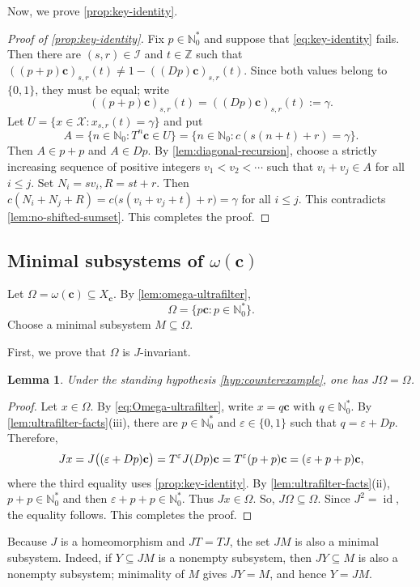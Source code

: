 \documentclass[reqno,12pt]{amsart}
\newtheorem{lemma}[thm]{Lemma}
\newcommand{\Nzero}{\mathbb N_0}
\newcommand{\Nstar}{\Nzero^{*}}
\newcommand{\two}{\{0,1\}}
\def \Z {\mathbb Z}
\numberwithin{equation}{section}
\begin{document}
Now, we prove \cref{prop:key-identity}.
\begin{proof}[Proof of \cref{prop:key-identity}]
		Fix $p\in\Nstar$ and suppose that \eqref{eq:key-identity} fails.  Then
		there are $(s,r)\in\mathcal I$ and $t\in\Z$ such that
		$
		((p+p)\mathbf c)_{s,r}(t)
		\neq 1-((Dp)\mathbf c)_{s,r}(t).
		$
Since both values belong to $\two$, they must be equal; write
				$$
		((p+p)\mathbf c)_{s,r}(t)
		=((Dp)\mathbf c)_{s,r}(t)
		:=\gamma.
		$$
		Let
		$
		U=\{x\in\mathcal X:x_{s,r}(t)=\gamma\}
		$
		and put
		\[
		A=\{n\in\Nzero:T^n\mathbf c\in U\}
		=\{n\in\Nzero:c(s(n+t)+r)=\gamma\}.
		\]
		Then $A\in p+p$ and $A\in Dp$.
		By \cref{lem:diagonal-recursion}, choose a strictly increasing sequence of
		positive integers $v_1<v_2<\cdots$ such that $v_i+v_j\in A$ for all $i\leq j$.  Set
		$
		N_i=sv_i,
		R=st+r.
		$
		Then
		$
		c(N_i+N_j+R)
		=c\bigl(s(v_i+v_j+t)+r\bigr)
		=\gamma
		$ for all $i\le j$.
	This contradicts \cref{lem:no-shifted-sumset}. This completes the proof.
\end{proof}

\subsection{Minimal subsystems of \texorpdfstring{$\omega(\mathbf c)$}{the omega-limit set}}

Let
$\Omega=\omega(\mathbf c)\subseteq X_{\mathbf c}$.
By \cref{lem:omega-ultrafilter},
\begin{equation}\label{eq:Omega-ultrafilter}
\Omega=\{p\mathbf c:p\in\Nstar\}.
\end{equation}
Choose a minimal subsystem $M\subseteq\Omega$.

First, we prove that $\Omega$ is $J$-invariant.
\begin{lemma}\label{lem:J-Omega}
	Under the standing hypothesis \eqref{hyp:counterexample}, one has
	$J\Omega=\Omega$.
\end{lemma}
\begin{proof}
	Let $x\in\Omega$.  By \eqref{eq:Omega-ultrafilter}, write
	$x=q\mathbf c$ with $q\in\Nstar$.  By
	\cref{lem:ultrafilter-facts}(iii), there are $p\in\Nstar$ and
	$\varepsilon\in\{0,1\}$ such that $q=\varepsilon+Dp$.  Therefore,
	$$
	Jx
	=J\bigl((\varepsilon+Dp)\mathbf c\bigr)\\
	=T^\varepsilon J(Dp)\mathbf c\\
	=T^\varepsilon(p+p)\mathbf c\\
	=(\varepsilon+p+p)\mathbf c,
	$$
	where the third equality uses \cref{prop:key-identity}.  By
	\cref{lem:ultrafilter-facts}(ii), $p+p\in\Nstar$ and then
	$\varepsilon+p+p\in\Nstar$.  Thus $Jx\in\Omega$. So,
	$J\Omega\subseteq\Omega$.  Since $J^2=\operatorname{id}$, the equality follows. This completes the proof.
\end{proof}
Because $J$ is a homeomorphism and $JT=TJ$, the set $JM$ is also a minimal
subsystem. Indeed, if $Y\subseteq JM$ is a nonempty subsystem, then
$JY\subseteq M$ is also a nonempty subsystem;
minimality of $M$ gives $JY=M$, and hence $Y=JM$.
\end{document}
